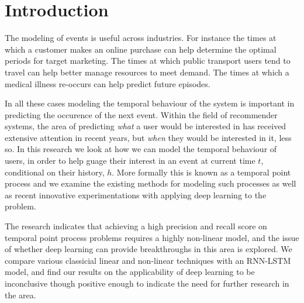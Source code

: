 
\chapter{Introduction} %

\label{Chapter1} %


\newcommand{\keyword}[1]{\textbf{#1}}
\newcommand{\tabhead}[1]{\textbf{#1}}
\newcommand{\code}[1]{\texttt{#1}}
\newcommand{\file}[1]{\texttt{\bfseries#1}}
\newcommand{\option}[1]{\texttt{\itshape#1}}

The modeling of events is useful across industries. For instance the times at which a customer makes an online purchase can help determine the optimal periods for target marketing. The times at which public transport users tend to travel can help better manage resources to meet demand. The times at which a medical illness re-occurs can help predict future episodes.
 
In all these cases modeling the temporal behaviour of the system is important in predicting the occurence of the next event. Within the field of recommender systems, the area of predicting \textit{what} a user would be interested in has received extensive attention in recent years, but \textit{when} they would be interested in it, less so. In this research we look at how we can model the temporal behaviour of users, in order to help guage their interest in an event at current time $t$, conditional on their history, $h$. More formally this is known as a temporal point process and we examine the existing methods for modeling such processes as well as recent innovative experimentations with applying deep learning to the problem.

The research indicates that achieving a high precision and recall score on temporal point process problems requires a highly non-linear model, and the issue of whether deep learning can provide breakthroughs in this area is explored. We compare various classicial linear and non-linear techniques with an RNN-LSTM model, and find our results on the applicability of deep learning to be inconclusive though positive enough to indicate the need for further research in the area.

